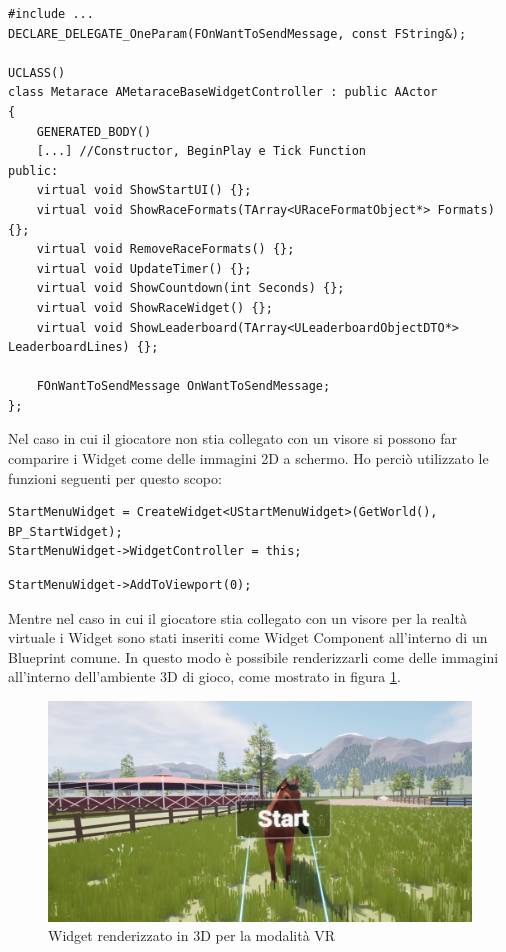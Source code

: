     \begin{lstlisting}[caption=File header della classe astratta BaseWidgetController]
#include ...
DECLARE_DELEGATE_OneParam(FOnWantToSendMessage, const FString&);

UCLASS()
class Metarace AMetaraceBaseWidgetController : public AActor
{
    GENERATED_BODY()
    [...] //Constructor, BeginPlay e Tick Function
public:
    virtual void ShowStartUI() {};
    virtual void ShowRaceFormats(TArray<URaceFormatObject*> Formats) {};
    virtual void RemoveRaceFormats() {};
    virtual void UpdateTimer() {};
    virtual void ShowCountdown(int Seconds) {};
    virtual void ShowRaceWidget() {};
    virtual void ShowLeaderboard(TArray<ULeaderboardObjectDTO*> LeaderboardLines) {};

    FOnWantToSendMessage OnWantToSendMessage;
};
    \end{lstlisting}

    Nel caso in cui il giocatore non stia collegato con un visore si possono far comparire i Widget come delle immagini 2D a schermo.
    Ho perciò utilizzato le funzioni seguenti per questo scopo:

    \begin{lstlisting}[caption = Crezione di istanza di Widget con StartMenuWidget come esempio]
StartMenuWidget = CreateWidget<UStartMenuWidget>(GetWorld(), BP_StartWidget);
StartMenuWidget->WidgetController = this;
    \end{lstlisting}

    \begin{lstlisting}[firstnumber=4, caption = Aggiunta di Widget al Viewport]
StartMenuWidget->AddToViewport(0);
    \end{lstlisting}

    Mentre nel caso in cui il giocatore stia collegato con un visore per la realtà virtuale i Widget sono stati inseriti come Widget Component all'interno di un Blueprint comune.
    In questo modo è possibile renderizzarli come delle immagini all'interno dell'ambiente 3D di gioco, come mostrato in figura \ref{img:WidgetVR}. 

    \begin{figure}[!t]\label{img:WidgetVR}
        \centering
        \includegraphics[width=12cm]{figure/StartMenuVRWidget2.png}
        \caption{Widget renderizzato in 3D per la modalità VR}
    \end{figure}


